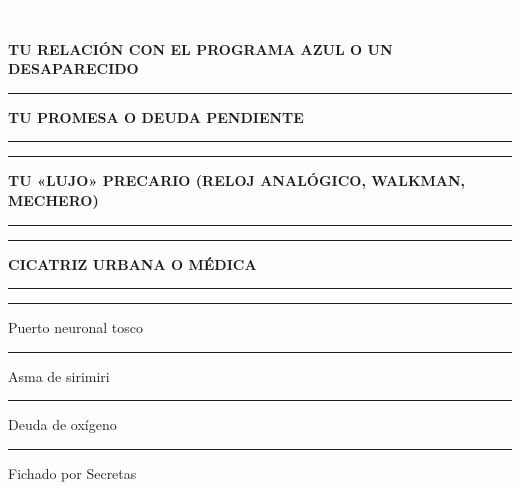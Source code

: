 \documentclass[10pt,a4paper,oneside]{book}
\newcommand{\rulefield}[2][\linewidth]{%
  \begin{minipage}[t]{#1}
  \textcolor{InkSoft}{\industrialfont\scriptsize\bfseries\MakeUppercase{#2}}\par
  \vspace{0.8mm}\textcolor{Line}{\rule{\linewidth}{0.45pt}}
  \end{minipage}}
\newcommand{\strip}[1]{%
  \vspace{0.8mm}\noindent
  \colorbox{CarbonDark}{\parbox{\dimexpr\linewidth-2\fboxsep\relax}{%
    \textcolor{white}{\industrialfont\bfseries\small\MakeUppercase{#1}}}}\par
  \vspace{0.8mm}}
\newcommand{\checkline}[2]{%
  \textcolor{#1}{\rule{2.4mm}{2.4mm}}\hspace{1mm}\textcolor{InkSoft}{\scriptsize #2}}
\begin{document}
\begin{minipage}[t]{0.48\linewidth}
  \strip{02 // Vínculo y lujo precario}
  \begin{tcolorbox}[enhanced,colback=BluePale,colframe=UrdinLoteria,boxrule=.6pt,
    arc=0.8mm,left=4pt,right=4pt,top=2.5pt,bottom=2.5pt,height=44mm]
    \scriptsize
    \rulefield{Tu relación con el Programa Azul o un desaparecido}\par\vspace{1mm}
    \rulefield{Tu promesa o deuda pendiente}\par\vspace{1mm}
    \textcolor{Line}{\rule{\linewidth}{.4pt}}\par\vspace{1mm}
    \rulefield{Tu «lujo» precario (reloj analógico, walkman, mechero)}\par\vspace{1mm}
    \textcolor{Line}{\rule{\linewidth}{.4pt}}\par\vspace{1mm}
    \rulefield{Cicatriz urbana o médica}\par\vspace{1mm}
    \checkline{UrdinLoteria}{Puerto neuronal tosco}\hfill
    \checkline{UrdinLoteria}{Asma de sirimiri}\par\vspace{0.8mm}
    \checkline{UrdinLoteria}{Deuda de oxígeno}\hfill
    \checkline{UrdinLoteria}{Fichado por Secretas}
  \end{tcolorbox}
\end{minipage}\hfill
\end{document}
